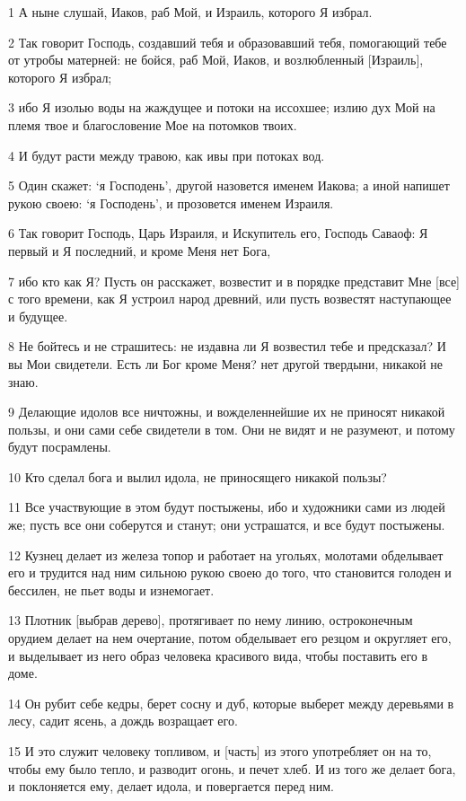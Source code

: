 \par 1 А ныне слушай, Иаков, раб Мой, и Израиль, которого Я избрал.
\par 2 Так говорит Господь, создавший тебя и образовавший тебя, помогающий тебе от утробы матерней: не бойся, раб Мой, Иаков, и возлюбленный [Израиль], которого Я избрал;
\par 3 ибо Я изолью воды на жаждущее и потоки на иссохшее; излию дух Мой на племя твое и благословение Мое на потомков твоих.
\par 4 И будут расти между травою, как ивы при потоках вод.
\par 5 Один скажет: `я Господень', другой назовется именем Иакова; а иной напишет рукою своею: `я Господень', и прозовется именем Израиля.
\par 6 Так говорит Господь, Царь Израиля, и Искупитель его, Господь Саваоф: Я первый и Я последний, и кроме Меня нет Бога,
\par 7 ибо кто как Я? Пусть он расскажет, возвестит и в порядке представит Мне [все] с того времени, как Я устроил народ древний, или пусть возвестят наступающее и будущее.
\par 8 Не бойтесь и не страшитесь: не издавна ли Я возвестил тебе и предсказал? И вы Мои свидетели. Есть ли Бог кроме Меня? нет другой твердыни, никакой не знаю.
\par 9 Делающие идолов все ничтожны, и вожделеннейшие их не приносят никакой пользы, и они сами себе свидетели в том. Они не видят и не разумеют, и потому будут посрамлены.
\par 10 Кто сделал бога и вылил идола, не приносящего никакой пользы?
\par 11 Все участвующие в этом будут постыжены, ибо и художники сами из людей же; пусть все они соберутся и станут; они устрашатся, и все будут постыжены.
\par 12 Кузнец делает из железа топор и работает на угольях, молотами обделывает его и трудится над ним сильною рукою своею до того, что становится голоден и бессилен, не пьет воды и изнемогает.
\par 13 Плотник [выбрав дерево], протягивает по нему линию, остроконечным орудием делает на нем очертание, потом обделывает его резцом и округляет его, и выделывает из него образ человека красивого вида, чтобы поставить его в доме.
\par 14 Он рубит себе кедры, берет сосну и дуб, которые выберет между деревьями в лесу, садит ясень, а дождь возращает его.
\par 15 И это служит человеку топливом, и [часть] из этого употребляет он на то, чтобы ему было тепло, и разводит огонь, и печет хлеб. И из того же делает бога, и поклоняется ему, делает идола, и повергается перед ним.
